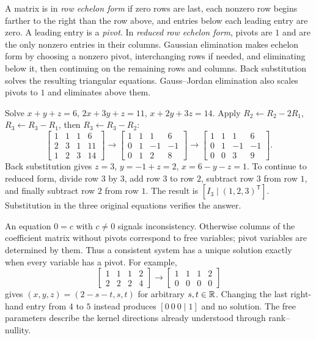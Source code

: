A matrix is in \emph{row echelon form} if zero rows are last, each nonzero
row begins farther to the right than the row above, and entries below
each leading entry are zero. A leading entry is a \emph{pivot}.
In \emph{reduced row echelon form}, pivots are $1$ and are the only
nonzero entries in their columns. Gaussian elimination makes echelon
form by choosing a nonzero pivot, interchanging rows if needed, and
eliminating below it, then continuing on the remaining rows and columns.
Back substitution solves the resulting triangular equations. Gauss--Jordan
elimination also scales pivots to $1$ and eliminates above them.

\begin{example}
Solve $x+y+z=6$, $2x+3y+z=11$, $x+2y+3z=14$.
Apply $R_2\leftarrow R_2-2R_1$, $R_3\leftarrow R_3-R_1$, then
$R_3\leftarrow R_3-R_2$:
\[
\left[\begin{array}{ccc|c}1&1&1&6\\2&3&1&11\\1&2&3&14\end{array}\right]
\longrightarrow
\left[\begin{array}{ccc|c}1&1&1&6\\0&1&-1&-1\\0&1&2&8\end{array}\right]
\longrightarrow
\left[\begin{array}{ccc|c}1&1&1&6\\0&1&-1&-1\\0&0&3&9\end{array}\right].
\]
Back substitution gives $z=3$, $y=-1+z=2$, $x=6-y-z=1$.
To continue to reduced form, divide row $3$ by $3$, add row $3$ to
row $2$, subtract row $3$ from row $1$, and finally subtract row $2$
from row $1$. The result is $[I_3\mid(1,2,3)^{\mathsf T}]$.
Substitution in the three original equations verifies the answer.
\end{example}
An equation $0=c$ with $c\ne0$ signals inconsistency. Otherwise columns
of the coefficient matrix without pivots correspond to free variables;
pivot variables are determined by them. Thus a consistent system has
a unique solution exactly when every variable has a pivot. For example,
\[
\left[\begin{array}{ccc|c}1&1&1&2\\2&2&2&4\end{array}\right]
\longrightarrow
\left[\begin{array}{ccc|c}1&1&1&2\\0&0&0&0\end{array}\right]
\]
gives $(x,y,z)=(2-s-t,s,t)$ for arbitrary $s,t\in\mathbb{R}$.
Changing the last right-hand entry from $4$ to $5$ instead produces
$[0\ 0\ 0\mid1]$ and no solution. The free parameters describe the
kernel directions already understood through rank--nullity.


